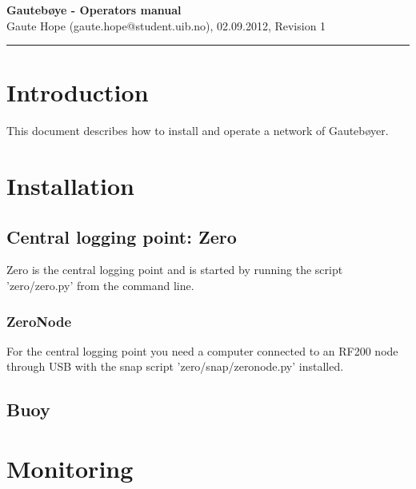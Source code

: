 \documentclass[a4paper]{article}
\newcommand{\makeheading}[2]%
        {\hspace*{-\marginparsep minus \marginparwidth}%
         \begin{minipage}[t]{\textwidth\marginparwidth\marginparsep}%
           {\large \bfseries #1}\\{#2}\\[-0.15\baselineskip]%
                 \rule{\columnwidth}{1pt}%
         \end{minipage}}
\begin{document}
\makeheading{Gautebøye - Operators manual}{Gaute Hope
(gaute.hope@student.uib.no), 02.09.2012, Revision 1}

\vspace{2em}
\section*{Introduction}
This document describes how to install and operate a network of
Gautebøyer.

\vspace{2em}
\section{Installation}

\subsection{Central logging point: Zero}
  Zero is the central logging point and is started by running the script
  'zero/zero.py' from the command line.


  \subsubsection{ZeroNode}
    For the central logging point you need a computer connected to an
    RF200 node through USB with the snap script 'zero/snap/zeronode.py'
    installed.

\subsection{Buoy}

\section{Monitoring}



\vspace{5em}
\end{document}
